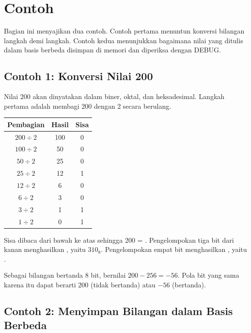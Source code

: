 \section{Contoh}
\label{sec:contoh-bab3}

Bagian ini menyajikan dua contoh. Contoh pertama menuntun konversi
bilangan langkah demi langkah. Contoh kedua menunjukkan bagaimana
nilai yang ditulis dalam basis berbeda disimpan di memori dan
diperiksa dengan DEBUG.

\subsection{Contoh 1: Konversi Nilai 200}

Nilai 200 akan dinyatakan dalam biner, oktal, dan heksadesimal.
Langkah pertama adalah membagi 200 dengan 2 secara berulang.

\begin{center}
\begin{tabular}{@{}ccc@{}}
    \toprule
    \textbf{Pembagian} & \textbf{Hasil} & \textbf{Sisa} \\
    \midrule
    $200 \div 2$ & 100 & 0 \\
    $100 \div 2$ & 50 & 0 \\
    $50 \div 2$ & 25 & 0 \\
    $25 \div 2$ & 12 & 1 \\
    $12 \div 2$ & 6 & 0 \\
    $6 \div 2$ & 3 & 0 \\
    $3 \div 2$ & 1 & 1 \\
    $1 \div 2$ & 0 & 1 \\
    \bottomrule
\end{tabular}
\end{center}

Sisa dibaca dari bawah ke atas sehingga 200 = .
Pengelompokan tiga bit dari kanan menghasilkan
  , yaitu $310_8$. Pengelompokan empat bit
menghasilkan  , yaitu .

Sebagai bilangan bertanda 8 bit,  bernilai
$200 - 256 = -56$. Pola bit yang sama karena itu dapat berarti 200
(tidak bertanda) atau $-56$ (bertanda).

\subsection{Contoh 2: Menyimpan Bilangan dalam Basis Berbeda}

